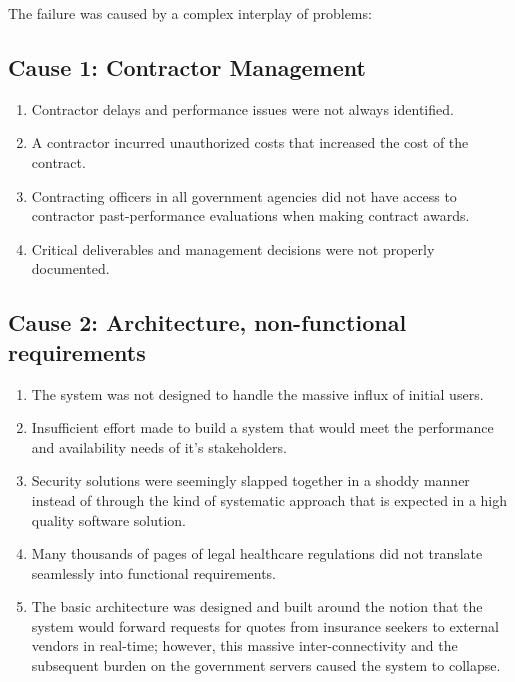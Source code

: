 \documentclass[]{article}
\begin{document}
The failure was caused by a complex interplay of problems:

\subsection{Cause 1: Contractor
Management}\label{cause-1-contractor-management}

\begin{enumerate}
\def\labelenumi{\arabic{enumi}.}
\itemsep1pt\parskip0pt
\item
  Contractor delays and performance issues were not always identified.
\item
  A contractor incurred unauthorized costs that increased the cost of
  the contract.
\item
  Contracting officers in all government agencies did not have access to
  contractor past-performance evaluations when making contract awards.
\item
  Critical deliverables and management decisions were not properly
  documented.
\end{enumerate}

\subsection{Cause 2: Architecture, non-functional
requirements}\label{cause-2-architecture-non-functional-requirements}

\begin{enumerate}
\def\labelenumi{\arabic{enumi}.}
\itemsep1pt\parskip0pt
\item
  The system was not designed to handle the massive influx of initial
  users.
\item
  Insufficient effort made to build a system that would meet the
  performance and availability needs of it's stakeholders.
\item
  Security solutions were seemingly slapped together in a shoddy manner
  instead of through the kind of systematic approach that is expected in
  a high quality software solution.
\item
  Many thousands of pages of legal healthcare regulations did not
  translate seamlessly into functional requirements.
\item
  The basic architecture was designed and built around the notion that
  the system would forward requests for quotes from insurance seekers to
  external vendors in real-time; however, this massive
  inter-connectivity and the subsequent burden on the government servers
  caused the system to collapse.
\end{enumerate}
\end{document}
